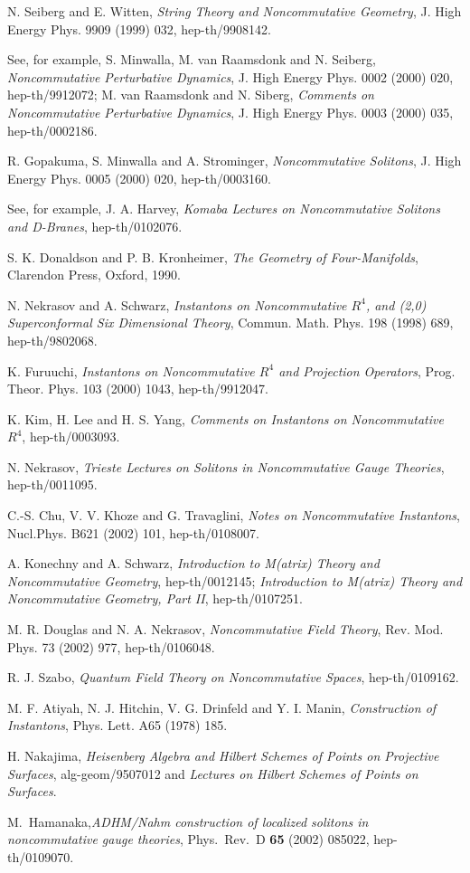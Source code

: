 \documentclass[a4paper,a4paper]{article}
\begin{document}
\begin{thebibliography}{99}

 N. Seiberg and E. Witten, {\it String Theory
and Noncommutative Geometry}, J. High Energy Phys. 9909 (1999)
032, hep-th/9908142.

 See, for example, S. Minwalla, M. van Raamsdonk
 and N. Seiberg,
{\it Noncommutative Perturbative Dynamics}, J. High Energy Phys.
0002 (2000) 020, hep-th/9912072; M. van Raamsdonk and N. Siberg,
{\it Comments on Noncommutative Perturbative Dynamics}, J. High
Energy Phys. 0003 (2000) 035, hep-th/0002186.

 R. Gopakuma, S. Minwalla and A. Strominger,
{\it Noncommutative Solitons}, J. High Energy Phys. 0005 (2000)
020, hep-th/0003160.

 See, for example, J. A. Harvey, {\it Komaba Lectures
on Noncommutative Solitons and D-Branes}, hep-th/0102076.

 S. K. Donaldson and P. B. Kronheimer, {\it The
Geometry of Four-Manifolds}, Clarendon Press, Oxford, 1990.

 N. Nekrasov and A. Schwarz, {\it Instantons on
Noncommutative $R^4$, and (2,0) Superconformal Six Dimensional
Theory}, Commun. Math. Phys. 198 (1998) 689, hep-th/9802068.

 K. Furuuchi, {\it Instantons on Noncommutative
$R^4$ and Projection Operators}, Prog. Theor. Phys. 103 (2000)
1043, hep-th/9912047.

 K. Kim, H. Lee and H. S. Yang, {\it Comments on
Instantons on Noncommutative $R^4$}, hep-th/0003093.

 N. Nekrasov, {\it Trieste Lectures on Solitons in
Noncommutative Gauge Theories}, hep-th/0011095.

 C.-S. Chu, V. V. Khoze and G. Travaglini, {\it
Notes on Noncommutative Instantons}, Nucl.Phys. B621 (2002) 101,
hep-th/0108007.

 A. Konechny and A. Schwarz, {\it Introduction to
M(atrix) Theory and Noncommutative Geometry}, hep-th/0012145; {\it
Introduction to M(atrix) Theory and Noncommutative Geometry, Part
II}, hep-th/0107251.

 M. R. Douglas and N. A. Nekrasov, {\it
Noncommutative Field Theory}, Rev. Mod. Phys. 73 (2002) 977,
hep-th/0106048.

 R. J. Szabo, {\it Quantum Field Theory on
Noncommutative Spaces}, hep-th/0109162.

 M. F. Atiyah, N. J. Hitchin, V. G. Drinfeld and Y.
I. Manin, {\it Construction of Instantons}, Phys. Lett. A65 (1978)
185.

 H. Nakajima, {\it Heisenberg Algebra and Hilbert
Schemes of Points on Projective Surfaces}, alg-geom/9507012 and
{\it Lectures on Hilbert Schemes of Points on Surfaces}.

 M.~Hamanaka,{\it ADHM/Nahm construction of localized solitons
in noncommutative gauge theories}, Phys.\ Rev.\ D {\bf 65} (2002)
085022, hep-th/0109070.

\end{thebibliography}
\end{document}
